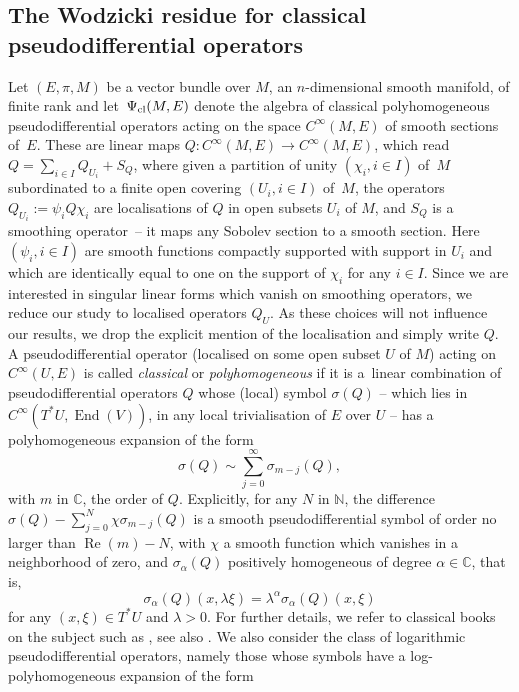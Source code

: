 \documentclass[pdftex]{sigma}
\numberwithin{equation}{section}
\theoremstyle{definition}
\newcommand{\C}{\mathbb C}
\newcommand{\N}{\mathbb N}
\begin{document}
\subsection{The Wodzicki residue for classical pseudodifferential operators}
Let $(E,\pi,M)$ be a vector bundle over $M$, an $n$-dimensional smooth manifold, of finite rank and let~$\Psi_{\rm cl}(M, E)$ denote the algebra of classical polyhomogeneous pseudodifferential operators acting on the space $C^\infty(M, E)$ of smooth sections of~$E$. These are linear maps $Q\colon C^\infty(M, E)\to C^\infty(M, E)$, which read $Q=\sum_{i\in I} Q_{U_i} +S_Q$, where given a partition of unity $(\chi_i, i\in I)$ of~$M$ subordinated to a finite open covering $(U_i, i\in I)$ of~$M$, the operators $Q_{U_i}:= \psi_i Q \chi_i $ are localisations of $Q$ in open subsets $U_i$ of $M$, and $S_Q$ is a smoothing operator~-- it maps any Sobolev section to a smooth section. Here $(\psi_i, i\in I)$ are smooth functions compactly supported with support in $U_i$ and which are identically equal to one on the support of $\chi_i$ for any $i\in I$. Since we are interested in singular linear forms which vanish on smoothing operators, we reduce our study to localised operators $Q_U$. As these choices will not influence our results, we drop the explicit mention of the localisation and simply write $Q$. A pseudodifferential operator (localised on some open subset $U$ of $M$) acting on $C^\infty(U, E)$ is called {\it classical} or {\it polyhomogeneous} if it is a~linear combination of pseudodifferential operators $Q$ whose (local) symbol $\sigma(Q)$ -- which lies in {$C^\infty(T^*U ,\operatorname{End}(V))$},
in any local trivialisation of $E$ over $U$ -- has a polyhomogeneous expansion of the form
\[\sigma(Q)\sim\sum_{j=0}^\infty \sigma_{m-j}(Q), \]
 with
$m$ in $ \C$, the order of $Q$. Explicitly, for any $N$ in $\N$, the difference
$\sigma(Q)-\sum_{j=0}^N\chi \sigma_{m-j}(Q)$ is a smooth pseudodifferential symbol of order no larger than $\operatorname{Re}(m)-N$, with $\chi$ a smooth function which vanishes in a neighborhood of zero, and $ \sigma_{\alpha}(Q)$ positively homogeneous of degree $\alpha\in \C$, that is,
\begin{equation*}
\sigma_{\alpha}(Q) (x,\lambda \xi)=\lambda^{\alpha} \sigma_{\alpha}(Q)(x, \xi)\end{equation*}
for any { $(x,\xi)\in T^*U $} and $\lambda>0$. For further details, we refer to classical books on the subject such as \cite{Sh}, see also \cite[Example~1.1.8]{Sc}.
We also consider the class of logarithmic pseudodifferential operators, namely those whose symbols have a log-polyhomogeneous expansion of the form
\end{document}
